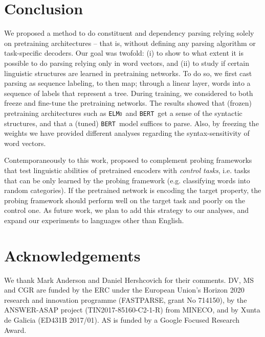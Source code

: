 \documentclass[letterpaper]{article} %
\newcommand{\citet}[1]{\citeauthor{#1} \shortcite{#1}}
\newcommand{\elmo}{\texttt{\textsc{ELMo}}}
\newcommand{\bert}{\texttt{\textsc{BERT}}}
\begin{document}
\section{Conclusion}

We proposed a method to do constituent and dependency parsing relying solely on pretraining architectures -- that is, without defining any parsing algorithm or task-specific decoders.
Our goal was twofold: (i) to show to what extent it is possible to do parsing relying only in word vectors, and  (ii) to study if certain linguistic structures are learned in pretraining networks. To do so, we first cast parsing as sequence labeling, to then map; through a linear layer, words into a sequence of labels that represent a tree. During training, we considered to both freeze and fine-tune the pretraining networks. The results showed that (frozen) pretraining architectures such as \elmo\ and \bert\ get a sense of the syntactic structures, and that a (tuned) \bert\ model suffices to parse. 
Also, by freezing the weights we have provided different analyses regarding the syntax-sensitivity of word vectors.

Contemporaneously to this work, \citet{hewitt-liang-2019-designing} proposed to complement probing frameworks that test linguistic abilities of pretrained encoders with \emph{control tasks}, i.e. tasks that can be only learned by the probing framework (e.g. classifying words into random categories). If the pretrained network is encoding the target property, the probing framework should perform well on the target task and poorly on the control one. As future work, we plan to add this strategy to our analyses, and expand our experiments to languages other than English.

\section*{Acknowledgements}

We thank Mark Anderson and Daniel Hershcovich for their comments. DV, MS and CGR are funded by the ERC under the European Union's Horizon 2020 research and innovation programme (FASTPARSE, grant No 714150), by the
ANSWER-ASAP project (TIN2017-85160-C2-1-R) from MINECO, and by Xunta de Galicia (ED431B 2017/01). AS is funded by a Google Focused Research Award.




\end{document}
